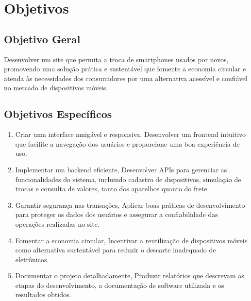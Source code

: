 \chapter{Objetivos}

\section{Objetivo Geral}
Desenvolver um site que permita a troca de smartphones usados por novos,
promovendo uma solução prática e sustentável que fomente a economia circular e
atenda às necessidades dos consumidores por uma alternativa acessível e confiável
no mercado de dispositivos móveis.

\section{Objetivos Específicos}
\begin{enumerate}
    \item Criar uma interface amigável e responsiva, Desenvolver um 
    frontend intuitivo que facilite a navegação dos usuários e 
    proporcione uma boa experiência de uso.
    \item Implementar um backend eficiente, Desenvolver APIs para gerenciar as
    funcionalidades do sistema, incluindo cadastro de dispositivos,
    simulação de trocas e consulta de valores, tanto dos aparelhos quanto do frete.
    \item Garantir segurança nas transações, Aplicar boas práticas de
    desenvolvimento para proteger os dados dos usuários e assegurar a
    confiabilidade das operações realizadas no site.
    \item Fomentar a economia circular, Incentivar a reutilização de dispositivos
    móveis como alternativa sustentável para reduzir o descarte inadequado
    de eletrônicos.
    \item Documentar o projeto detalhadamente, Produzir relatórios que
    descrevam as etapas do desenvolvimento, a documentação de software utilizada e os resultados obtidos.
\end{enumerate}

    


\label{chap:Objetivos}